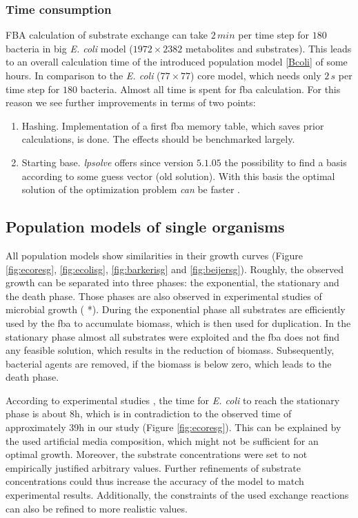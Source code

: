 \subsubsection{Time consumption}
FBA calculation of substrate exchange can take $2\,min$ per time step for $180$ bacteria in big \textit{E. coli} model ($1972\times 2382$ metabolites and substrates).
This leads to an overall calculation time of the introduced population model \ref{Bcoli} of some hours.
In comparison to the \textit{E. coli} ($77\times 77$) core model, which needs only $2\,s$ per time step for $180$ bacteria.
Almost all time is spent for fba calculation.
For this reason we see further improvements in terms of two points:
\begin{enumerate}
  \item Hashing. Implementation of a first fba memory table, which saves prior calculations, is done.
    The effects should be benchmarked largely.
  \item Starting base. \textit{lpsolve} offers since version $5.1.05$ the possibility to find a basis according to some guess vector (old solution).
    With this basis the optimal solution of the optimization problem \textit{can} be faster \cite{warmstart}.
\end{enumerate}

\subsection{Population models of single organisms}
All population models show similarities in their growth curves (Figure \hyperref[fig:ecoresg]{\ref{fig:ecoresg}}, \hyperref[fig:ecolisg]{\ref{fig:ecolisg}}, \hyperref[fig:barkerisg]{\ref{fig:barkerisg}} and \hyperref[fig:beijersg]{\ref{fig:beijersg}}).
Roughly, the observed growth can be separated into three phases: the exponential, the stationary and the death phase. Those phases are also observed in experimental studies of microbial growth ( *).
During the exponential phase all substrates are efficiently used by the fba to accumulate biomass, which is then used for duplication. In the stationary phase almost all substrates were exploited and the fba does not find any feasible solution, which results in the reduction of biomass. Subsequently, bacterial agents are removed, if the biomass is below zero, which leads to the death phase.

According to experimental studies \cite{Varma94}, the time for \emph{E. coli} to reach the stationary phase is about 8\;h, which is in contradiction to the observed time of approximately 39\;h in our study (Figure \hyperref[fig:ecoresg]{\ref{fig:ecoresg}}). This can be explained by the used artificial media composition, which might not be sufficient for an optimal growth.
Moreover, the substrate concentrations were set to not empirically justified arbitrary values. Further refinements of substrate concentrations could thus increase the accuracy of the model to match experimental results. Additionally, the constraints of the used exchange reactions can also be refined to more realistic values.

